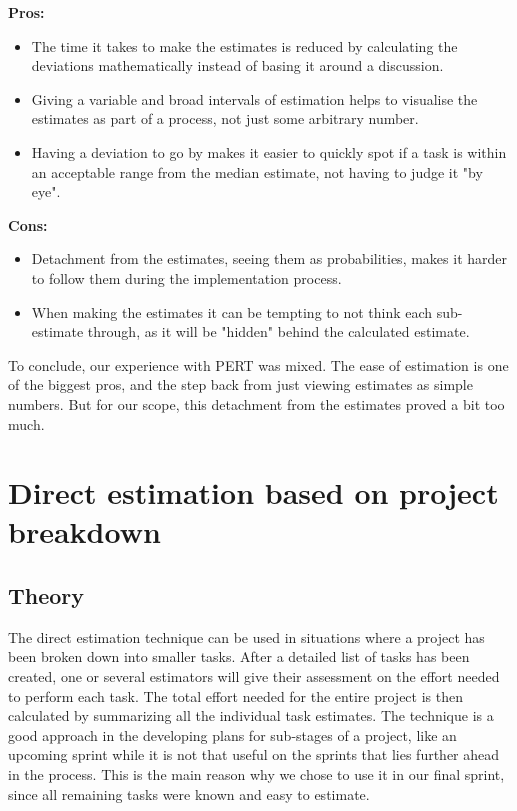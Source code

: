 \textbf{Pros:}
\begin{itemize}
\item The time it takes to make the estimates is reduced by calculating the deviations mathematically instead of basing it around a discussion. 
\item Giving a variable and broad intervals of estimation helps to visualise the estimates as part of a process, not just some arbitrary number.
\item Having a deviation to go by makes it easier to quickly spot if a task is within an acceptable range from the median estimate, not having to judge it "by eye".

\end{itemize}

\textbf{Cons:}
\begin{itemize}
\item Detachment from the estimates, seeing them as probabilities, makes it harder to follow them during the implementation process.
\item When making the estimates it can be tempting to not think each sub-estimate through, as it will be "hidden" behind the calculated estimate.

\end{itemize}

To conclude, our experience with PERT was mixed. The ease of estimation is one of the biggest pros, and the step back from just viewing estimates as simple numbers. But for our scope, this detachment from the estimates proved a bit too much.

\section{Direct estimation based on project breakdown}
\subsection{Theory}
The direct estimation technique can be used in situations where a project has been broken down into smaller tasks. After a detailed list of tasks has been created, one or several estimators will give their assessment on the effort needed to perform each task. The total effort needed for the entire project is then calculated by summarizing all the individual task estimates.
The technique is a good approach in the developing plans for sub-stages of a project, like an upcoming sprint while it is not that useful on the sprints that lies further ahead in the process. This is the main reason why we chose to use it in our final sprint, since all remaining tasks were known and easy to estimate.


